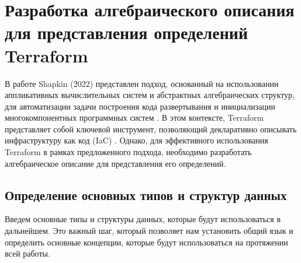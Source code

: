 \chapter{Разработка алгебраического описания для представления
определений Terraform}

В работе Shapkin (2022) представлен подход, основанный на использовании
аппликативных вычислительных систем и абстрактных алгебраических структур,
для автоматизации задачи построения кода развертывания и инициализации
многокомпонентных программных систем \cite{shapkin-automation-2022}.
В этом контексте, Terraform представляет собой ключевой инструмент,
позволяющий декларативно описывать инфраструктуру как код (IaC)
\cite{iaas2017}. Однако, для эффективного использования Terraform
в рамках предложенного подхода, необходимо разработать алгебраическое
описание для представления его определений.

\section{Определение основных типов и структур данных}

Введем основные типы и структуры данных, которые будут использоваться в
дальнейшем. Это важный шаг, который позволяет нам установить общий язык и
определить основные концепции, которые будут использоваться на протяжении всей
работы.

